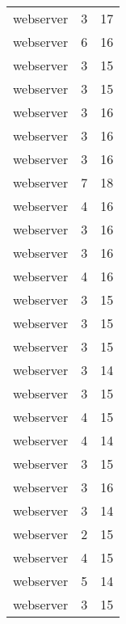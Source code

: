 \begin{table}
\begin{tabular}{lrr}
                       webserver &         3 &        17 \\
                       webserver &         6 &        16 \\
                       webserver &         3 &        15 \\
                       webserver &         3 &        15 \\
                       webserver &         3 &        16 \\
                       webserver &         3 &        16 \\
                       webserver &         3 &        16 \\
                       webserver &         7 &        18 \\
                       webserver &         4 &        16 \\
                       webserver &         3 &        16 \\
                       webserver &         3 &        16 \\
                       webserver &         4 &        16 \\
                       webserver &         3 &        15 \\
                       webserver &         3 &        15 \\
                       webserver &         3 &        15 \\
                       webserver &         3 &        14 \\
                       webserver &         3 &        15 \\
                       webserver &         4 &        15 \\
                       webserver &         4 &        14 \\
                       webserver &         3 &        15 \\
                       webserver &         3 &        16 \\
                       webserver &         3 &        14 \\
                       webserver &         2 &        15 \\
                       webserver &         4 &        15 \\
                       webserver &         5 &        14 \\
                       webserver &         3 &        15 \\

\end{tabular}
\end{table}
